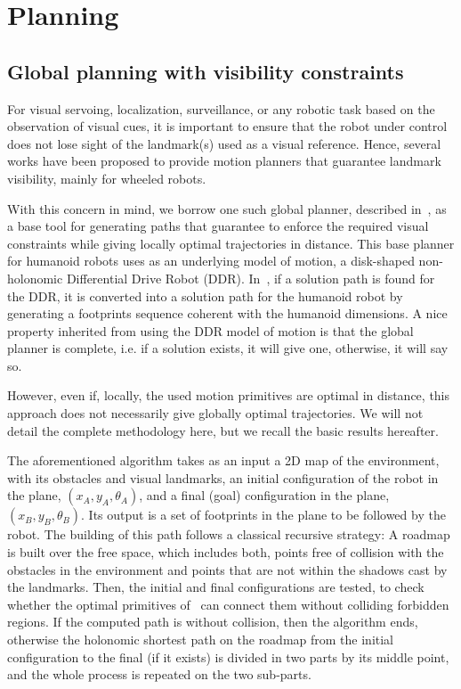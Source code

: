 \chapter{Planning} 
\label{Chap:Visual-Planning}

\section{Global planning with visibility constraints}

\label{sec:globalplanning}

For visual servoing, localization, surveillance, or any robotic task based on the observation of visual cues, it is important to ensure that the robot under control does not lose sight of the landmark(s) used as a visual reference. Hence, several works have been proposed to provide motion planners that guarantee landmark visibility, mainly for wheeled robots.

With this concern in mind, we borrow one such global planner, described in~\cite{jib-IJHR2010},  as a base tool for generating paths that guarantee to enforce the required visual constraints while giving locally optimal trajectories in distance. This base planner for humanoid robots uses as an underlying model of motion, a disk-shaped non-holonomic Differential Drive Robot (DDR). In~\cite{jib-IJHR2010}, if a solution path is found for the DDR, it is converted into a solution path for the humanoid robot by generating a footprints sequence coherent with the humanoid dimensions. A nice property inherited from using the DDR model of motion is that the global planner is complete, i.e.  if a solution exists, it will give one, otherwise, it will say so.

However, even if, locally, the used motion primitives are optimal in distance, this approach does not necessarily give globally optimal trajectories. We will not detail the complete methodology here, but we recall the basic results hereafter.

The aforementioned algorithm takes as an input a 2D map of the environment, with its obstacles and visual landmarks, an initial configuration of the robot in the plane, $(x_A,y_A,\theta_A)$, and a final (goal) configuration in the plane, $(x_B,y_B,\theta_B)$. Its output is a set of footprints in the plane to be followed by the robot. The building of this path follows a classical recursive strategy: A roadmap is built over the free space, which includes both, points free of collision with the obstacles in the environment and points that are not within the shadows cast by the landmarks. Then, the initial and final configurations are tested, to check whether the optimal primitives of~\cite{Salaris:2010} can connect them without colliding forbidden regions. If the computed path is without collision, then the algorithm ends, otherwise the holonomic shortest path on the roadmap from the initial configuration to the final (if it exists) is divided in two parts by its middle point, and the whole process is repeated on the two sub-parts. 

